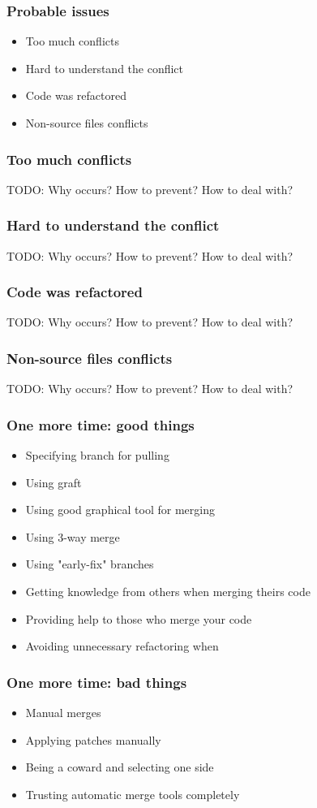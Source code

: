 \documentclass{beamer}
\begin{document}
\begin{frame}
\frametitle{Probable issues}
\begin{itemize}
\item Too much conflicts
\item Hard to understand the conflict
\item Code was refactored
\item Non-source files conflicts
\end{itemize}
\end{frame}

\begin{frame}
\frametitle{Too much conflicts}
TODO: Why occurs? How to prevent? How to deal with? 
\end{frame}

\begin{frame}
\frametitle{Hard to understand the conflict}
TODO: Why occurs? How to prevent? How to deal with? 
\end{frame}

\begin{frame}
\frametitle{Code was refactored}
TODO: Why occurs? How to prevent? How to deal with? 
\end{frame}

\begin{frame}
\frametitle{Non-source files conflicts}
TODO: Why occurs? How to prevent? How to deal with? 
\end{frame}


\begin{frame}
\frametitle{One more time: good things}
\begin{itemize}
\item Specifying branch for pulling
\item Using graft
\item Using good graphical tool for merging
\item Using 3-way merge
\item Using "early-fix" branches
\item Getting knowledge from others when merging theirs code
\item Providing help to those who merge your code
\item Avoiding unnecessary refactoring when
\end{itemize}
\end{frame}

\begin{frame}
\frametitle{One more time: bad things}
\begin{itemize}
\item Manual merges
\item Applying patches manually
\item Being a coward and selecting one side
\item Trusting automatic merge tools completely
\end{itemize}
\end{frame}
\end{document}
